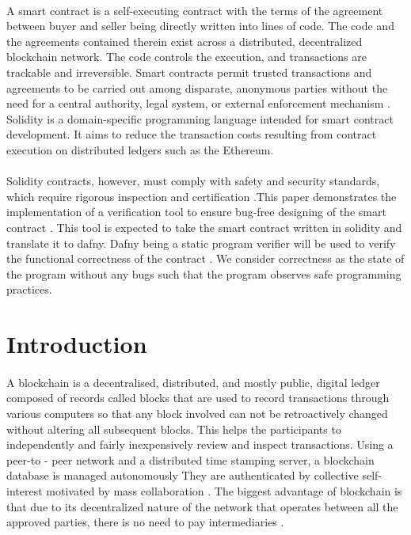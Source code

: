 \documentclass[11pt]{article}
\begin{document}
\paragraph{}
A smart contract is a self-executing contract with the terms of the agreement between buyer and seller being directly written into lines of code. The code and the agreements contained therein exist across a distributed, decentralized blockchain network. The code controls the execution, and transactions are trackable and irreversible. Smart contracts permit trusted transactions and agreements to be carried out among disparate, anonymous parties without the need for a central authority, legal system, or external enforcement mechanism \cite{Website:1}. Solidity is a domain-specific programming language intended for smart contract development. It aims to reduce the transaction costs resulting from contract execution on distributed ledgers such as the Ethereum. 
\paragraph{}
Solidity contracts, however, must comply with safety and security standards, which require rigorous inspection and certification \cite{zhu2020formal}.This paper demonstrates the implementation of a verification tool to ensure bug-free designing of the smart contract . This tool is expected to take the smart contract written in solidity and translate it to dafny. Dafny being a static program verifier will be used to verify the functional correctness of the contract \cite{DafnyALa19:online}. We consider correctness as the state of the program without any bugs such that the program observes safe programming practices.

\section{Introduction}
\paragraph{}
A blockchain is a decentralised, distributed, and mostly public, digital ledger composed of records called blocks that are used to record transactions through various computers so that any block involved can not be retroactively changed without altering all subsequent blocks. This helps the participants to independently and fairly inexpensively review and inspect transactions. Using a peer-to - peer network and a distributed time stamping server, a blockchain database is managed autonomously They are authenticated by collective self-interest motivated by mass collaboration \cite{Blockcha25:online}. The biggest advantage of blockchain is that due to its decentralized nature of the network that operates between all the approved parties, there is no need to pay intermediaries \cite{WhatAreS98:online}.
\end{document}
